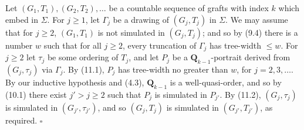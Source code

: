 Let $(G_1, T_1), (G_2, T_2), \dots$ be a countable sequence of grafts with index $k$ which embed in $\Sigma$. For $j \ge 1$, let $\Gamma_j$ be a drawing of $(G_j, T_j)$ in $\Sigma$. We may assume that for $j \ge 2$, $(G_1, T_1)$ is not simulated in $(G_j, T_j)$; and so by (9.4) there is a number $w$ such that for all $j \ge 2$, every truncation of $\Gamma_j$ has tree-width $\le w$. For $j \ge 2$ let $\tau_j$ be some ordering of $T_j$, and let $P_j$ be a $\mathbf{Q}_{k - 1}$-portrait derived from $(G_j, \tau_j)$ via $\Gamma_j$. By (11.1), $P_j$ has tree-width no greater than $w$, for $j = 2, 3, \dots.$ By our inductive hypothesis and (4.3), $\mathbf{Q}_{k - 1}$ is a well-quasi-order, and so by (10.1) there exist $j' > j \ge 2$ such that $P_j$ is simulated in $P_{j'}$. By (11.2), $(G_j, \tau_j)$ is simulated in $(G_{j'}, \tau_{j'})$, and so $(G_j, T_j)$ is simulated in $(G_{j'}, T_{j'})$, as required. $\square$
